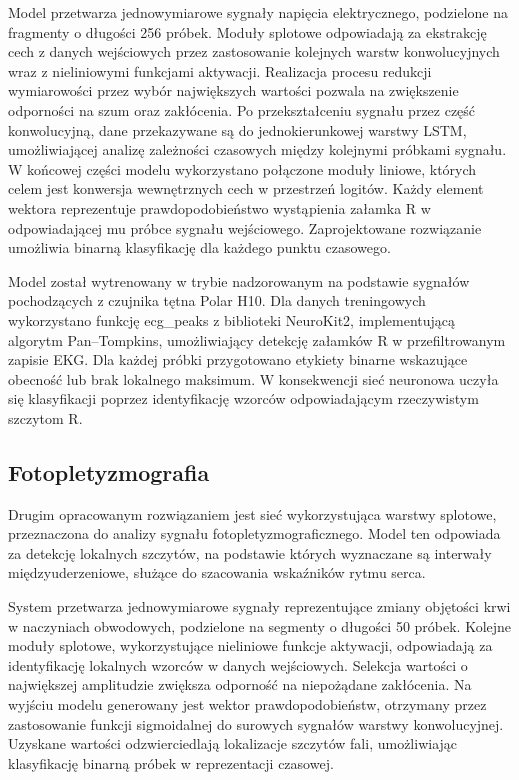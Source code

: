 \documentclass[journal]{IEEEtran}
\begin{document}
Model przetwarza jednowymiarowe sygnały napięcia elektrycznego, podzielone na fragmenty o długości 256 próbek. Moduły splotowe odpowiadają za ekstrakcję cech z danych wejściowych przez zastosowanie kolejnych warstw konwolucyjnych wraz z nieliniowymi funkcjami aktywacji. Realizacja procesu redukcji wymiarowości przez wybór największych wartości pozwala na zwiększenie odporności na szum oraz zakłócenia. Po przekształceniu sygnału przez część konwolucyjną, dane przekazywane są do jednokierunkowej warstwy LSTM, umożliwiającej analizę zależności czasowych między kolejnymi próbkami sygnału. W końcowej części modelu wykorzystano połączone moduły liniowe, których celem jest konwersja wewnętrznych cech w przestrzeń logitów. Każdy element wektora reprezentuje prawdopodobieństwo wystąpienia załamka R w odpowiadającej mu próbce sygnału wejściowego. Zaprojektowane rozwiązanie umożliwia binarną klasyfikację dla każdego punktu czasowego.

\newpage
Model został wytrenowany w trybie nadzorowanym na podstawie sygnałów pochodzących z czujnika tętna Polar H10. Dla danych treningowych wykorzystano funkcję ecg\_peaks z biblioteki NeuroKit2, implementującą algorytm Pan–Tompkins, umożliwiający detekcję załamków R w przefiltrowanym zapisie EKG. Dla każdej próbki przygotowano etykiety binarne wskazujące obecność lub brak lokalnego maksimum. W konsekwencji sieć neuronowa uczyła się klasyfikacji poprzez identyfikację wzorców odpowiadającym rzeczywistym szczytom R.


\subsection{Fotopletyzmografia}
Drugim opracowanym rozwiązaniem jest sieć wykorzystująca warstwy splotowe, przeznaczona do analizy sygnału fotopletyzmograficznego. Model ten odpowiada za detekcję lokalnych szczytów, na podstawie których wyznaczane są interwały międzyuderzeniowe, służące do szacowania wskaźników rytmu serca.

System przetwarza jednowymiarowe sygnały reprezentujące zmiany objętości krwi w naczyniach obwodowych, podzielone na segmenty o długości 50 próbek. Kolejne moduły splotowe, wykorzystujące nieliniowe funkcje aktywacji, odpowiadają za identyfikację lokalnych wzorców w danych wejściowych. Selekcja wartości o największej amplitudzie zwiększa odporność na niepożądane zakłócenia. Na wyjściu modelu generowany jest wektor prawdopodobieństw, otrzymany przez zastosowanie funkcji sigmoidalnej do surowych sygnałów warstwy konwolucyjnej. Uzyskane wartości odzwierciedlają lokalizacje szczytów fali, umożliwiając klasyfikację binarną próbek w reprezentacji czasowej.
\end{document}
